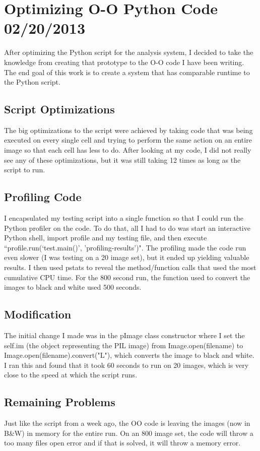 \documentclass[]{article}
\begin{document}
	\section{Optimizing O-O Python Code 02/20/2013}
		After optimizing the Python script for the analysis system, I decided to take the knowledge from creating that prototype to the O-O code I have been writing. The end goal of this work is to create a system that has comparable runtime to the Python script.
		
		\subsection{Script Optimizations}
			The big optimizations to the script were achieved by taking code that was being executed on every single cell and trying to perform the same action on an entire image so that each cell has less to do. After looking at my code, I did not really see any of these optimizations, but it was still taking 12 times as long as the script to run.
			
		\subsection{Profiling Code}
			I encapsulated my testing script into a single function so that I could run the Python profiler on the code. To do that, all I had to do was start an interactive Python shell, import profile and my testing file, and then execute ``profile.run(`test.main()', 'profiling-results')". The profiling made the code run even slower (I was testing on a 20 image set), but it ended up yielding valuable results. I then used pstats to reveal the method/function calls that used the most cumulative CPU time. For the 800 second run, the function used to convert the images to black and white used 500 seconds. 
			
		\subsection{Modification}
			The initial change I made was in the pImage class constructor where I set the self.im (the object representing the PIL image) from Image.open(filename) to Image.open(filename).convert("L"), which converts the image to black and white. I ran this and found that it took 60 seconds to run on 20 images, which is very close to the speed at which the script runs. 
			
		\subsection{Remaining Problems}
			Just like the script from a week ago, the O\-O code is leaving the images (now in B\&W) in memory for the entire run. On an 800 image set, the code will throw a too many files open error and if that is solved, it will throw a memory error. 
			
\end{document}
